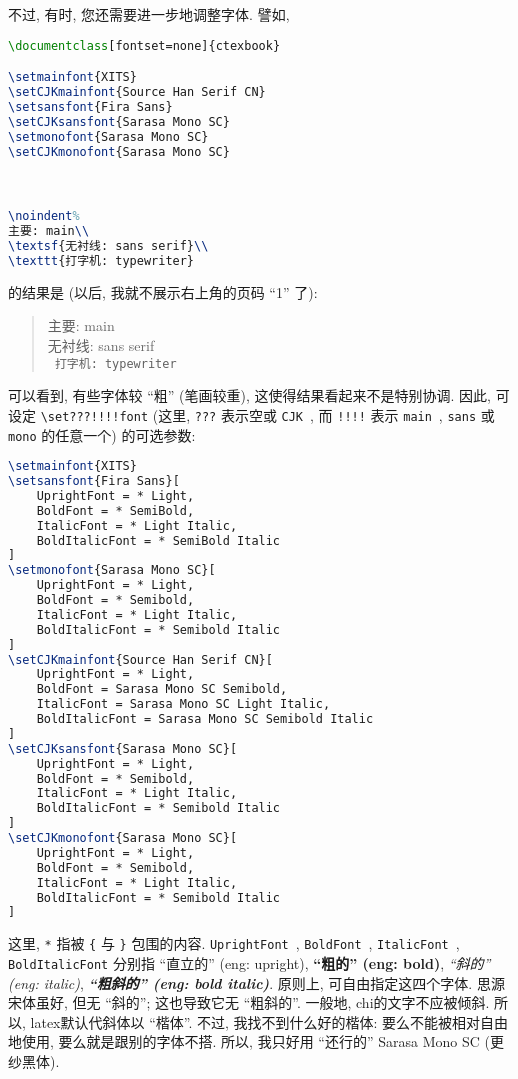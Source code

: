 不过, 有时, 您还需要进一步地调整字体.
譬如,
\begin{lstlisting}[language=TeX]
\documentclass[fontset=none]{ctexbook}

\setmainfont{XITS}
\setCJKmainfont{Source Han Serif CN}
\setsansfont{Fira Sans}
\setCJKsansfont{Sarasa Mono SC}
\setmonofont{Sarasa Mono SC}
\setCJKmonofont{Sarasa Mono SC}



\noindent%
主要: main\\
\textsf{无衬线: sans serif}\\
\texttt{打字机: typewriter}


\end{lstlisting}
的结果是 (以后, 我就不展示右上角的页码 ``1'' 了):
\begin{quotation}
    \noindent%
    \textrm{%
        主要: main}\\
    \textsf{%
        无衬线: sans serif}\\
    \texttt{%
        打字机: typewriter}
\end{quotation}
可以看到, 有些字体较 ``粗'' (笔画较重),
这使得结果看起来不是特别协调.
因此, 可设定 \verb`\set???!!!!font`
(这里, \verb`???` 表示空或 \verb`CJK`~,
而 \verb`!!!!` 表示
\verb`main`~, \verb`sans` 或 \verb`mono`
的任意一个)
的可选参数:
\begin{lstlisting}[language=TeX]
\setmainfont{XITS}
\setsansfont{Fira Sans}[
    UprightFont = * Light,
    BoldFont = * SemiBold,
    ItalicFont = * Light Italic,
    BoldItalicFont = * SemiBold Italic
]
\setmonofont{Sarasa Mono SC}[
    UprightFont = * Light,
    BoldFont = * Semibold,
    ItalicFont = * Light Italic,
    BoldItalicFont = * Semibold Italic
]
\setCJKmainfont{Source Han Serif CN}[
    UprightFont = * Light,
    BoldFont = Sarasa Mono SC Semibold,
    ItalicFont = Sarasa Mono SC Light Italic,
    BoldItalicFont = Sarasa Mono SC Semibold Italic
]
\setCJKsansfont{Sarasa Mono SC}[
    UprightFont = * Light,
    BoldFont = * Semibold,
    ItalicFont = * Light Italic,
    BoldItalicFont = * Semibold Italic
]
\setCJKmonofont{Sarasa Mono SC}[
    UprightFont = * Light,
    BoldFont = * Semibold,
    ItalicFont = * Light Italic,
    BoldItalicFont = * Semibold Italic
]
\end{lstlisting}
这里, \verb`*` 指被 \verb`{` 与 \verb`}` 包围的内容.
\verb`UprightFont`~, \verb`BoldFont`~,
\verb`ItalicFont`~, \verb`BoldItalicFont`
分别指
\textrm{``直立的'' (\gls{eng}: upright)},
\textbf{``粗的'' (\gls{eng}: bold)},
\textit{``斜的'' (\gls{eng}: italic)},
\textbf{\textit{``粗斜的'' (\gls{eng}: bold italic)}}.
原则上, 可自由指定这四个字体.
思源宋体虽好, 但无 ``斜的'';
这也导致它无 ``粗斜的''.
一般地, \gls{chi}的文字不应被倾斜.
所以, \gls{latex}默认代斜体以 ``楷体''.
不过, 我找不到什么好的楷体:
要么不能被相对自由地使用,
要么就是跟别的字体不搭.
所以, 我只好用 ``还行的'' Sarasa Mono SC (更纱黑体).

